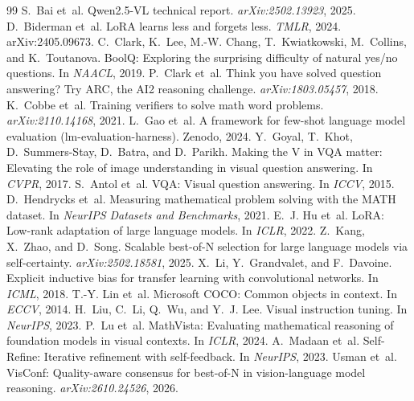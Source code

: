 \documentclass{article}
\begin{document}
\begin{thebibliography}{99}
\small
{} S.~Bai et~al. Qwen2.5-VL technical report. \emph{arXiv:2502.13923}, 2025.
 D.~Biderman et~al. LoRA learns less and forgets less. \emph{TMLR}, 2024. arXiv:2405.09673.
 C.~Clark, K.~Lee, M.-W. Chang, T.~Kwiatkowski, M.~Collins, and K.~Toutanova. BoolQ: Exploring the surprising difficulty of natural yes/no questions. In \emph{NAACL}, 2019.
 P.~Clark et~al. Think you have solved question answering? Try ARC, the AI2 reasoning challenge. \emph{arXiv:1803.05457}, 2018.
 K.~Cobbe et~al. Training verifiers to solve math word problems. \emph{arXiv:2110.14168}, 2021.
 L.~Gao et~al. A framework for few-shot language model evaluation (lm-evaluation-harness). Zenodo, 2024.
 Y.~Goyal, T.~Khot, D.~Summers-Stay, D.~Batra, and D.~Parikh. Making the V in VQA matter: Elevating the role of image understanding in visual question answering. In \emph{CVPR}, 2017.
 S.~Antol et~al. VQA: Visual question answering. In \emph{ICCV}, 2015.
 D.~Hendrycks et~al. Measuring mathematical problem solving with the MATH dataset. In \emph{NeurIPS Datasets and Benchmarks}, 2021.
 E.~J. Hu et~al. LoRA: Low-rank adaptation of large language models. In \emph{ICLR}, 2022.
 Z.~Kang, X.~Zhao, and D.~Song. Scalable best-of-N selection for large language models via self-certainty. \emph{arXiv:2502.18581}, 2025.
 X.~Li, Y.~Grandvalet, and F.~Davoine. Explicit inductive bias for transfer learning with convolutional networks. In \emph{ICML}, 2018.
 T.-Y. Lin et~al. Microsoft COCO: Common objects in context. In \emph{ECCV}, 2014.
 H.~Liu, C.~Li, Q.~Wu, and Y.~J. Lee. Visual instruction tuning. In \emph{NeurIPS}, 2023.
 P.~Lu et~al. MathVista: Evaluating mathematical reasoning of foundation models in visual contexts. In \emph{ICLR}, 2024.
 A.~Madaan et~al. Self-Refine: Iterative refinement with self-feedback. In \emph{NeurIPS}, 2023.
 Usman et~al. VisConf: Quality-aware consensus for best-of-N in vision-language model reasoning. \emph{arXiv:2610.24526}, 2026.

\end{thebibliography}
\end{document}
